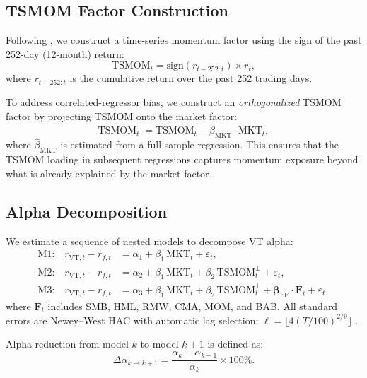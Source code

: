 \documentclass[12pt,a4paper]{article}
\begin{document}
\subsection{TSMOM Factor Construction}

Following \citet{moskowitz2012}, we construct a time-series momentum factor using the sign of the past 252-day (12-month) return:
\begin{equation}
\text{TSMOM}_t = \text{sign}(r_{t-252:t}) \times r_t,
\label{eq:tsmom}
\end{equation}
where $r_{t-252:t}$ is the cumulative return over the past 252 trading days.

To address correlated-regressor bias, we construct an \textit{orthogonalized} TSMOM factor by projecting TSMOM onto the market factor:
\begin{equation}
\text{TSMOM}_t^{\perp} = \text{TSMOM}_t - \hat{\beta}_{\text{MKT}} \cdot \text{MKT}_t,
\label{eq:tsmom_orth}
\end{equation}
where $\hat{\beta}_{\text{MKT}}$ is estimated from a full-sample regression. This ensures that the TSMOM loading in subsequent regressions captures momentum exposure beyond what is already explained by the market factor \citep{hood2025}.

\subsection{Alpha Decomposition}

We estimate a sequence of nested models to decompose VT alpha:
\begin{align}
\text{M1:} \quad r_{\text{VT},t} - r_{f,t} &= \alpha_1 + \beta_1 \, \text{MKT}_t + \varepsilon_t, \label{eq:m1} \\
\text{M2:} \quad r_{\text{VT},t} - r_{f,t} &= \alpha_2 + \beta_1 \, \text{MKT}_t + \beta_2 \, \text{TSMOM}_t^{\perp} + \varepsilon_t, \label{eq:m2} \\
\text{M3:} \quad r_{\text{VT},t} - r_{f,t} &= \alpha_3 + \beta_1 \, \text{MKT}_t + \beta_2 \, \text{TSMOM}_t^{\perp} + \boldsymbol{\beta}_{\text{FF}} \cdot \mathbf{F}_t + \varepsilon_t, \label{eq:m3}
\end{align}
where $\mathbf{F}_t$ includes SMB, HML, RMW, CMA, MOM, and BAB. All standard errors are Newey--West HAC with automatic lag selection: $\ell = \lfloor 4(T/100)^{2/9} \rfloor$ \citep{newey1987}.

Alpha reduction from model $k$ to model $k+1$ is defined as:
\begin{equation}
\Delta\alpha_{k \to k+1} = \frac{\alpha_k - \alpha_{k+1}}{\alpha_k} \times 100\%.
\label{eq:alpha_reduction}
\end{equation}
\end{document}

